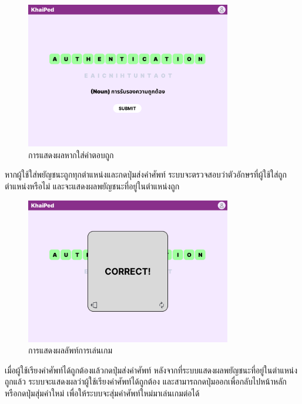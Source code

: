 \documentclass[12pt,oneside,openright,a4paper]{cpe-thai-project}
\begin{document}
\begin{figure}[!h]\centering
	\includegraphics[width=0.8\textwidth, keepaspectratio=true]{image/chap3/ui/game/Word Scramble - Correct Answer.png}
	\caption{การแสดงผลหากใส่คำตอบถูก}\label{fig:UI_GameCorrect}
\end{figure}
\hspace{1cm}
หากผู้ใช้ใส่พยัญชนะถูกทุกตำแหน่งและกดปุ่มส่งคำศัพท์ ระบบจะตรวจสอบว่าตัวอักษรที่ผู้ใช้ใส่ถูกตำแหน่งหรือไม่ และจะแสดงผลพยัญชนะที่อยู่ในตำแหน่งถูก

\pagebreak
\begin{figure}[!h]\centering
	\includegraphics[width=0.8\textwidth, keepaspectratio=true]{image/chap3/ui/game/Word Scramble - Pop Up.png}
	\caption{การแสดงผลลัพท์การเล่นเกม}\label{fig:UI_GameResult}
\end{figure}
\hspace{1cm}
เมื่อผู้ใช้เรียงคำศัพท์ได้ถูกต้องแล้วกดปุ่มส่งคำศัพท์ หลังจากที่ระบบแสดงผลพยัญชนะที่อยู่ในตำแหน่งถูกแล้ว ระบบจะแสดงผลว่าผู้ใช้เรียงคำศัพท์ได้ถูกต้อง
และสามารถกดปุ่มออกเพื่อกลับไปหน้าหลัก หรือกดปุ่มสุ่มคำใหม่ เพื่อให้ระบบจะสุ่มคำศัพท์ใหม่มาเล่นเกมต่อได้
\end{document}
